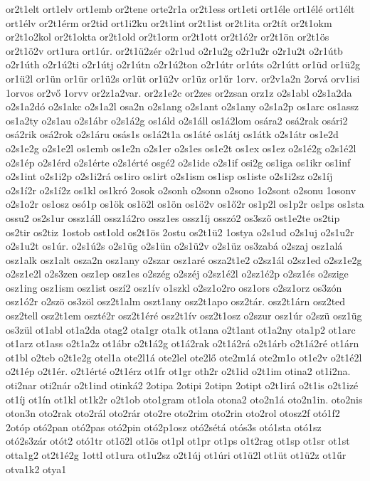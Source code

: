 {or2t1elt
ort1elv
ort1emb
or2tene
orte2r1a
or2t1ess
ort1eti
ort1éle
ort1élé
ort1élt
ort1élv
or2t1érm
or2tid
ort1i2ku
or2t1int
or2t1ist
or2t1ita
or2tít
or2t1okm
or2t1o2kol
or2t1okta
or2t1old
or2t1orm
or2t1ott
or2t1ó2r
or2t1ön
or2t1ös
or2t1ö2v
ort1ura
ort1úr.
or2t1ü2zér
o2r1ud
o2r1u2g
o2r1u2r
o2r1u2t
o2r1útb
o2r1úth
o2r1ú2ti
o2r1útj
o2r1útn
o2r1ú2ton
o2r1útr
or1úts
o2r1útt
or1üd
or1ü2g
or1ü2l
or1ün
or1ür
or1ü2s
or1üt
or1ü2v
or1üz
or1űr
1orv.
or2v1a2n
2orvá
orv1isi
1orvos
or2vő
1orvv
or2z1a2var.
or2z1e2c
or2zes
or2zsan
orz1z
o2s1abl
o2s1a2da
o2s1a2dó
o2s1akc
o2s1a2l
osa2n
o2s1ang
o2s1ant
o2s1any
o2s1a2p
os1arc
os1assz
os1a2ty
o2s1au
o2s1ábr
o2s1á2g
os1áld
o2s1áll
os1á2lom
osára2
osá2rak
osári2
osá2rik
osá2rok
o2s1áru
osás1s
os1á2t1a
os1áté
os1átj
os1átk
o2s1átr
os1e2d
o2s1e2g
o2s1e2l
os1emb
os1e2n
o2s1er
o2s1es
os1e2t
os1ex
os1ez
o2s1é2g
o2s1é2l
o2s1ép
o2s1érd
o2s1érte
o2s1érté
osgé2
o2s1ide
o2s1if
osi2g
os1iga
os1ikr
os1inf
o2s1int
o2s1i2p
o2s1i2rá
os1iro
os1irt
o2s1ism
os1isp
os1iste
o2s1i2sz
o2s1íj
o2s1í2r
o2s1í2z
os1kl
os1kró
2osok
o2sonh
o2sonn
o2sono
1o2sont
o2sonu
1osonv
o2s1o2r
os1osz
osó1p
os1ök
os1ö2l
os1ön
os1ö2v
os1ő2r
os1p2l
os1p2r
os1ps
os1sta
ossu2
os2s1ur
ossz1áll
ossz1á2ro
ossz1es
ossz1íj
osszó2
os3sző
ost1e2te
os2tip
os2tir
os2tiz
1ostob
ost1old
os2t1ös
2ostu
os2t1ü2
1ostya
o2s1ud
o2s1uj
o2s1u2r
o2s1u2t
os1úr.
o2s1ú2s
o2s1üg
o2s1ün
o2s1ü2v
o2s1üz
os3zabá
o2szaj
osz1alá
osz1alk
osz1alt
osza2n
osz1any
o2szar
osz1aré
osza2t1e2
o2sz1ál
o2sz1ed
o2sz1e2g
o2sz1e2l
o2s3zen
osz1ep
osz1es
o2szég
o2széj
o2sz1é2l
o2sz1é2p
o2sz1és
o2szige
osz1ing
osz1ism
osz1ist
oszí2
osz1ív
o1szkl
o2sz1o2ro
osz1ors
o2sz1orz
os3zón
osz1ó2r
o2szö
os3zöl
osz2t1alm
oszt1any
osz2t1apo
osz2tár.
osz2t1árn
osz2ted
osz2tell
osz2t1em
oszté2r
osz2t1éré
osz2t1ív
osz2t1osz
o2szur
osz1úr
o2szü
osz1üg
os3zül
ot1abl
ot1a2da
otag2
ota1gr
ota1k
ot1ana
o2t1ant
ot1a2ny
ota1p2
ot1arc
ot1arz
ot1ass
o2t1a2z
ot1ábr
o2t1á2g
ot1á2rak
o2t1á2rá
o2t1árb
o2t1á2ré
ot1árn
ot1bl
o2teb
o2t1e2g
otel1a
ote2l1á
ote2lel
ote2lő
ote2m1á
ote2m1o
ot1e2v
o2t1é2l
o2t1ép
o2t1ér.
o2t1érté
o2t1érz
ot1fr
ot1gr
oth2r
o2t1id
o2t1im
otina2
ot1i2na.
oti2nar
oti2nár
o2t1ind
otinká2
2otipa
2otipi
2otipn
2otipt
o2t1irá
o2t1is
o2t1izé
ot1íj
ot1ín
ot1kl
ot1k2r
o2t1ob
oto1gram
ot1ola
otona2
oto2n1á
oto2n1in.
oto2nis
oton3n
oto2rak
oto2rál
oto2rár
oto2re
oto2rim
oto2rin
oto2rol
otosz2f
otó1f2
2otóp
otó2pan
otó2pas
otó2pin
otó2p1osz
otó2sétá
otós3s
otó1sta
otó1sz
otó2s3zár
otót2
otó1tr
ot1ö2l
ot1ös
ot1pl
ot1pr
ot1ps
o1t2rag
ot1sp
ot1sr
ot1st
otta1g2
ot2t1é2g
1ottl
ot1ura
ot1u2sz
o2t1új
ot1úri
ot1ü2l
ot1üt
ot1ü2z
ot1űr
otva1k2
otya1
}
